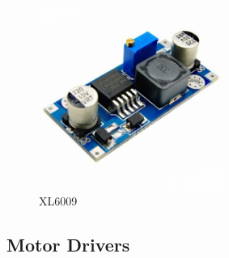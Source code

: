 \begin{itemize}[wide, labelwidth=!, labelindent=0pt]
    \begin{figure}[H]
    \centering
    \includegraphics[width = 6cm]{project/images/lm2596.jpg}
    \caption{XL6009}
    \end{figure}

\end{itemize}

\subsection{Motor Drivers}

